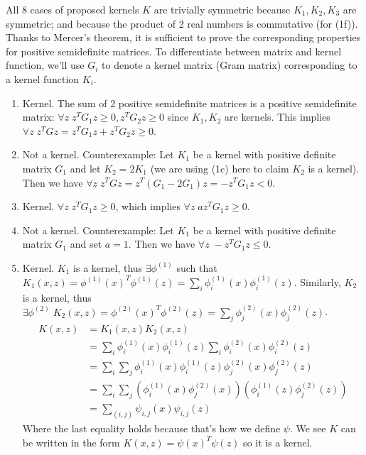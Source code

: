 \begin{answer}
  All 8 cases of proposed kernels $K$ are trivially symmetric because
  $K_1, K_2, K_3$ are symmetric; and because the product of 2 real
  numbers is commutative (for (1f)).  Thanks to Mercer's theorem, it
  is sufficient to prove the corresponding properties for positive
  semidefinite matrices.  To differentiate between matrix and kernel
  function, we'll use $G_i$ to denote a kernel matrix (Gram matrix)
  corresponding to a kernel function $K_i$.

  \begin{enumerate}

  \item Kernel.  The sum of 2 positive semidefinite matrices is a
    positive semidefinite matrix: $\forall z\; z^T G_1 z \geq 0, z^T
    G_2 z \geq 0$ since $K_1, K_2$ are kernels.  This implies $\forall
    z\; z^T G z = z^T G_1 z + z^T G_2 z \geq 0$.

  \item Not a kernel.  Counterexample: Let $K_1$ be a kernel with positive definite matrix $G_1$ and let $K_2 = 2K_1$ (we are using
    (1c) here to claim $K_2$ is a kernel).  Then we have $\forall z\;
    z^T G z = z^T (G_1 - 2G_1) z = -z^T G_1 z < 0$.

  \item Kernel.  $\forall z\; z^T G_1 z \geq 0$, which implies
    $\forall z\; a z^T G_1 z \geq 0$.

  \item Not a kernel.  Counterexample: Let $K_1$ be a kernel with positive definite matrix $G_1$ and set $a = 1$.  Then we have $\forall
    z\; -z^T G_1 z \leq 0$.

  \item Kernel.  $K_1$ is a kernel, thus $\exists \phi^{(1)}$ such that
    $K_1(x, z) = \phi^{(1)} (x)^T \phi^{(1)} (z) = \sum_i \phi_i^{(1)} (x)
    \phi_i^{(1)} (z)$.  Similarly, $K_2$ is a kernel, thus $\exists
    \phi^{(2)}\; K_2(x, z) = \phi^{(2)} (x)^T \phi^{(2)} (z) = \sum_j
    \phi_j^{(2)} (x) \phi_j^{(2)} (z)$.
    \begin{align}
      K(x, z)
      &= K_1(x, z)K_2(x, z) \\
      &= \sum_i \phi_i^{(1)} (x) \phi_i^{(1)} (z) \sum_i \phi_i^{(2)}
      (x) \phi_i^{(2)} (z) \\
      &= \sum_i \sum_j \phi_i^{(1)} (x) \phi_i^{(1)} (z) \phi_j^{(2)}
      (x) \phi_j^{(2)} (z) \\
      &= \sum_i \sum_j (\phi_i^{(1)} (x) \phi_j^{(2)} (x))
      (\phi_i^{(1)} (z) \phi_j^{(2)} (z)) \\
      &= \sum_{(i,j)} \psi_{i, j}(x) \psi_{i, j}(z)
    \end{align}
    Where the last equality holds because that's how we define
    $\psi$.  We see $K$ can be written in the form $K(x, z) =
    \psi(x)^T \psi(z)$ so it is a kernel.


\end{enumerate}
\end{answer}
